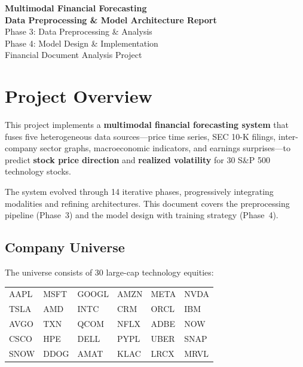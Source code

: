 \documentclass[12pt, a4paper]{article}
\begin{document}
\begin{titlepage}
\centering
\vspace*{2cm}
{\Huge\bfseries Multimodal Financial Forecasting\\[0.4cm]
\Large Data Preprocessing \& Model Architecture Report}\\[2cm]
{\large Phase 3: Data Preprocessing \& Analysis\\
Phase 4: Model Design \& Implementation}\\[2cm]
{\large Financial Document Analysis Project}\\[1cm]
\vfill
\end{titlepage}

\tableofcontents
\newpage

\section{Project Overview}

This project implements a \textbf{multimodal financial forecasting system} that fuses five heterogeneous data sources---price time series, SEC 10-K filings, inter-company sector graphs, macroeconomic indicators, and earnings surprises---to predict \textbf{stock price direction} and \textbf{realized volatility} for 30 S\&P 500 technology stocks.

The system evolved through 14 iterative phases, progressively integrating modalities and refining architectures.  This document covers the preprocessing pipeline (Phase~3) and the model design with training strategy (Phase~4).

\subsection{Company Universe}

The universe consists of 30 large-cap technology equities:

\begin{center}
\small
\begin{tabular}{llllll}
\toprule
AAPL & MSFT & GOOGL & AMZN & META & NVDA \\
TSLA & AMD  & INTC  & CRM  & ORCL & IBM  \\
AVGO & TXN  & QCOM  & NFLX & ADBE & NOW  \\
CSCO & HPE  & DELL  & PYPL & UBER & SNAP \\
SNOW & DDOG & AMAT  & KLAC & LRCX & MRVL \\
\bottomrule
\end{tabular}
\end{center}
\end{document}
